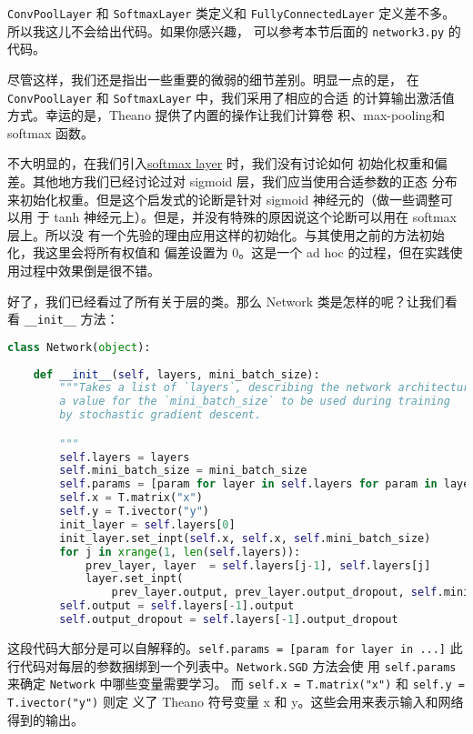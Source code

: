 \lstinline!ConvPoolLayer! 和 \lstinline!SoftmaxLayer! 类定义和
\lstinline!FullyConnectedLayer! 定义差不多。所以我这儿不会给出代码。如果你感兴趣，
可以参考本节后面的 \lstinline!network3.py! 的代码。

尽管这样，我们还是指出一些重要的微弱的细节差别。明显一点的是，
在 \lstinline!ConvPoolLayer! 和 \lstinline!SoftmaxLayer! 中，我们采用了相应的合适
的计算输出激活值方式。幸运的是，Theano 提供了内置的操作让我们计算卷
积、max-pooling和 softmax 函数。

不大明显的，在我们引入\hyperref[sec:softmax]{softmax layer} 时，我们没有讨论如何
初始化权重和偏差。其他地方我们已经讨论过对 sigmoid 层，我们应当使用合适参数的正态
分布来初始化权重。但是这个启发式的论断是针对 sigmoid 神经元的（做一些调整可以用
于 tanh 神经元上）。但是，并没有特殊的原因说这个论断可以用在 softmax 层上。所以没
有一个先验的理由应用这样的初始化。与其使用之前的方法初始化，我这里会将所有权值和
偏差设置为 $0$。这是一个 ad hoc 的过程，但在实践使用过程中效果倒是很不错。

好了，我们已经看过了所有关于层的类。那么 Network 类是怎样的呢？让我们看
看 \lstinline!__init__! 方法：

\begin{lstlisting}[language=Python]
class Network(object):
    
    def __init__(self, layers, mini_batch_size):
        """Takes a list of `layers`, describing the network architecture, and
        a value for the `mini_batch_size` to be used during training
        by stochastic gradient descent.

        """
        self.layers = layers
        self.mini_batch_size = mini_batch_size
        self.params = [param for layer in self.layers for param in layer.params]
        self.x = T.matrix("x")  
        self.y = T.ivector("y")
        init_layer = self.layers[0]
        init_layer.set_inpt(self.x, self.x, self.mini_batch_size)
        for j in xrange(1, len(self.layers)):
            prev_layer, layer  = self.layers[j-1], self.layers[j]
            layer.set_inpt(
                prev_layer.output, prev_layer.output_dropout, self.mini_batch_size)
        self.output = self.layers[-1].output
        self.output_dropout = self.layers[-1].output_dropout
\end{lstlisting}

这段代码大部分是可以自解释的。\lstinline!self.params = [param for layer in ...]!
此行代码对每层的参数捆绑到一个列表中。\lstinline!Network.SGD! 方法会使
用 \lstinline!self.params! 来确定 \lstinline!Network! 中哪些变量需要学习。
而 \lstinline!self.x = T.matrix("x")! 和 \lstinline!self.y = T.ivector("y")! 则定
义了 Theano 符号变量 x 和 y。这些会用来表示输入和网络得到的输出。

